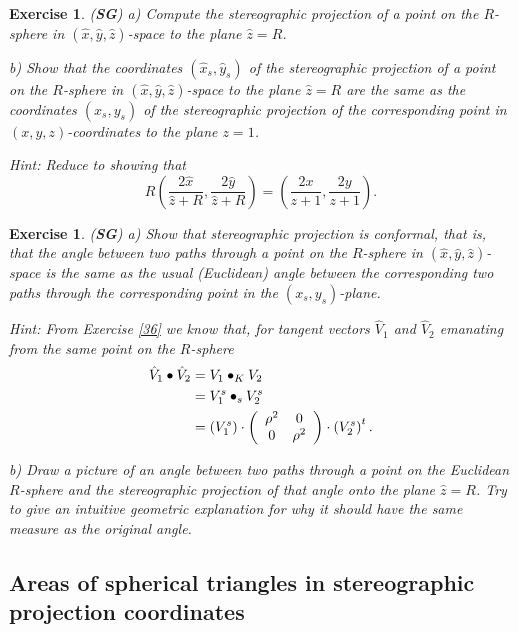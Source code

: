 \documentclass{article}%
\newtheorem{exercise}[theorem]{Exercise}
\begin{document}
\begin{exercise}
(\textbf{SG}) a) Compute the stereographic projection of a point on the
$R$-sphere in $\left(  \hat{x},\hat{y},\hat{z}\right)  $-space to the plane
$\hat{z}=R$.

b) Show that the coordinates $\left(  \hat{x}_{s},\hat{y}_{s}\right)  $ of the
stereographic projection of a point on the $R$-sphere in $\left(  \hat{x}%
,\hat{y},\hat{z}\right)  $-space to the plane $\hat{z}=R$ are the same as the
coordinates $\left(  x_{s},y_{s}\right)  $ of the stereographic projection of
the corresponding point in $\left(  x,y,z\right)  $-coordinates to the plane
$z=1$.

Hint: Reduce to showing that%
\[
R\left(  \frac{2\hat{x}}{\hat{z}+R},\frac{2\hat{y}}{\hat{z}+R}\right)
=\left(  \frac{2x}{z+1},\frac{2y}{z+1}\right)  .
\]

\end{exercise}

\begin{exercise}
(\textbf{SG}) a) Show that stereographic projection is conformal, that is,
that the angle between two paths through a point on the $R$-sphere in $\left(
\hat{x},\hat{y},\hat{z}\right)  $-space is the same as the usual (Euclidean)
angle between the corresponding two paths through the corresponding point in
the $\left(  x_{s},y_{s}\right)  $-plane.

Hint: From Exercise \ref{36} we know that, for tangent vectors $\hat{V}_{1}$
and $\hat{V}_{2}$ emanating from the same point on the $R$-sphere
\begin{align*}
\hat{V}_{1}\bullet\hat{V}_{2}  &  =V_{1}\bullet_{K}V_{2}\\
&  =V_{1}^{s}\bullet_{s}V_{2}^{s}\\
&  =\left(  V_{1}^{s}\right)  \cdot\left(
\begin{array}
[c]{cc}%
\rho^{2} & 0\\
0 & \rho^{2}%
\end{array}
\right)  \cdot\left(  V_{2}^{s}\right)  ^{t}.
\end{align*}


b) Draw a picture of an angle between two paths through a point on the
Euclidean $R$-sphere and the stereographic projection of that angle onto the
plane $\hat{z}=R$. Try to give an intuitive geometric explanation for why it
should have the same measure as the original angle.\pagebreak
\end{exercise}

\subsection{Areas of spherical triangles in stereographic projection
coordinates}
\end{document}
